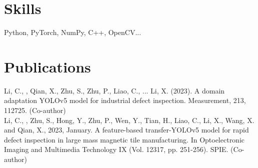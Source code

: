 \documentclass{ExpressiveResume}
\begin{document}
\section{Skills}
\noindent Python, PyTorch, NumPy, C++, OpenCV... \\

\section{Publications}
\noindent [1] Li, C., , Qian, X., Zhu, S., Zhu, P., Liao, C., ... Li, X. (2023). A domain adaptation YOLOv5 model for industrial defect inspection. Measurement, 213, 112725. (Co-author) \\
\noindent [2] Li, C., , Zhu, S., Hong, Y., Zhu, P., Wen, Y., Tian, H., Liao, C., Li, X., Wang, X. and Qian, X., 2023, January. A feature-based transfer-YOLOv5 model for rapid defect inspection in large mass magnetic tile manufacturing. In Optoelectronic Imaging and Multimedia Technology IX (Vol. 12317, pp. 251-256). SPIE. (Co-author)
\end{document}

